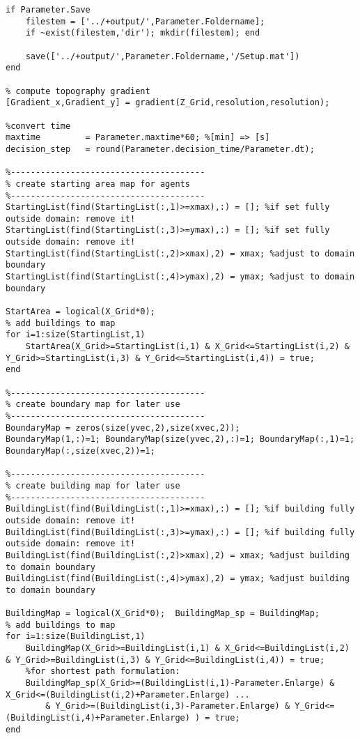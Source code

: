 \begin{lstlisting}[breaklines]
% saves setup
if Parameter.Save
    filestem = ['../+output/',Parameter.Foldername];
    if ~exist(filestem,'dir'); mkdir(filestem); end

    save(['../+output/',Parameter.Foldername,'/Setup.mat'])
end

% compute topography gradient
[Gradient_x,Gradient_y] = gradient(Z_Grid,resolution,resolution);

%convert time
maxtime         = Parameter.maxtime*60; %[min] => [s]
decision_step   = round(Parameter.decision_time/Parameter.dt);

%---------------------------------------
% create starting area map for agents
%---------------------------------------
StartingList(find(StartingList(:,1)>=xmax),:) = []; %if set fully outside domain: remove it!
StartingList(find(StartingList(:,3)>=ymax),:) = []; %if set fully outside domain: remove it!
StartingList(find(StartingList(:,2)>xmax),2) = xmax; %adjust to domain boundary
StartingList(find(StartingList(:,4)>ymax),2) = ymax; %adjust to domain boundary

StartArea = logical(X_Grid*0);
% add buildings to map
for i=1:size(StartingList,1)
    StartArea(X_Grid>=StartingList(i,1) & X_Grid<=StartingList(i,2) & Y_Grid>=StartingList(i,3) & Y_Grid<=StartingList(i,4)) = true;
end

%---------------------------------------
% create boundary map for later use
%---------------------------------------
BoundaryMap = zeros(size(yvec,2),size(xvec,2));
BoundaryMap(1,:)=1; BoundaryMap(size(yvec,2),:)=1; BoundaryMap(:,1)=1; BoundaryMap(:,size(xvec,2))=1;

%---------------------------------------
% create building map for later use
%---------------------------------------
BuildingList(find(BuildingList(:,1)>=xmax),:) = []; %if building fully outside domain: remove it!
BuildingList(find(BuildingList(:,3)>=ymax),:) = []; %if building fully outside domain: remove it!
BuildingList(find(BuildingList(:,2)>xmax),2) = xmax; %adjust building to domain boundary
BuildingList(find(BuildingList(:,4)>ymax),2) = ymax; %adjust building to domain boundary

BuildingMap = logical(X_Grid*0);  BuildingMap_sp = BuildingMap;
% add buildings to map
for i=1:size(BuildingList,1)
    BuildingMap(X_Grid>=BuildingList(i,1) & X_Grid<=BuildingList(i,2) & Y_Grid>=BuildingList(i,3) & Y_Grid<=BuildingList(i,4)) = true;
    %for shortest path formulation:
    BuildingMap_sp(X_Grid>=(BuildingList(i,1)-Parameter.Enlarge) & X_Grid<=(BuildingList(i,2)+Parameter.Enlarge) ...
        & Y_Grid>=(BuildingList(i,3)-Parameter.Enlarge) & Y_Grid<=(BuildingList(i,4)+Parameter.Enlarge) ) = true;
end


\end{lstlisting}
